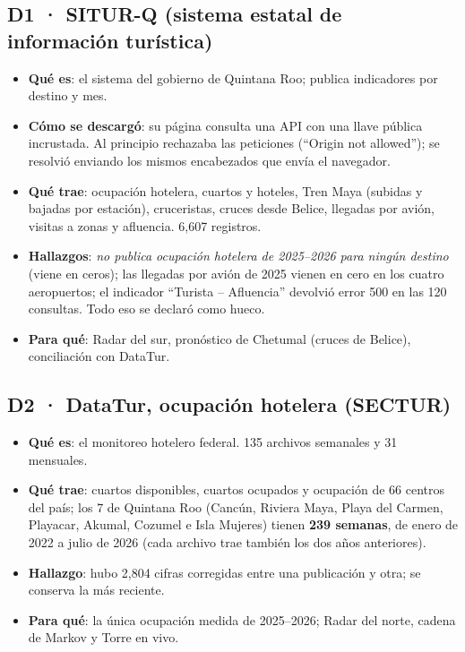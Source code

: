 \subsection*{D1 · SITUR-Q (sistema estatal de información turística)}
\begin{itemize}
\item \textbf{Qué es}: el sistema del gobierno de Quintana Roo; publica indicadores por destino y mes.
\item \textbf{Cómo se descargó}: su página consulta una API con una llave pública incrustada. Al principio rechazaba las
  peticiones (``Origin not allowed''); se resolvió enviando los mismos encabezados que envía el navegador.
\item \textbf{Qué trae}: ocupación hotelera, cuartos y hoteles, Tren Maya (subidas y bajadas por estación), cruceristas,
  cruces desde Belice, llegadas por avión, visitas a zonas y afluencia. 6,607 registros.
\item \textbf{Hallazgos}: \emph{no publica ocupación hotelera de 2025–2026 para ningún destino} (viene en ceros); las
  llegadas por avión de 2025 vienen en cero en los cuatro aeropuertos; el indicador ``Turista – Afluencia'' devolvió
  error 500 en las 120 consultas. Todo eso se declaró como hueco.
\item \textbf{Para qué}: Radar del sur, pronóstico de Chetumal (cruces de Belice), conciliación con DataTur.
\end{itemize}

\subsection*{D2 · DataTur, ocupación hotelera (SECTUR)}
\begin{itemize}
\item \textbf{Qué es}: el monitoreo hotelero federal. 135 archivos semanales y 31 mensuales.
\item \textbf{Qué trae}: cuartos disponibles, cuartos ocupados y ocupación de 66 centros del país; los 7 de Quintana Roo
  (Cancún, Riviera Maya, Playa del Carmen, Playacar, Akumal, Cozumel e Isla Mujeres) tienen \textbf{239 semanas}, de enero
  de 2022 a julio de 2026 (cada archivo trae también los dos años anteriores).
\item \textbf{Hallazgo}: hubo 2,804 cifras corregidas entre una publicación y otra; se conserva la más reciente.
\item \textbf{Para qué}: la única ocupación medida de 2025–2026; Radar del norte, cadena de Markov y Torre en vivo.
\end{itemize}

